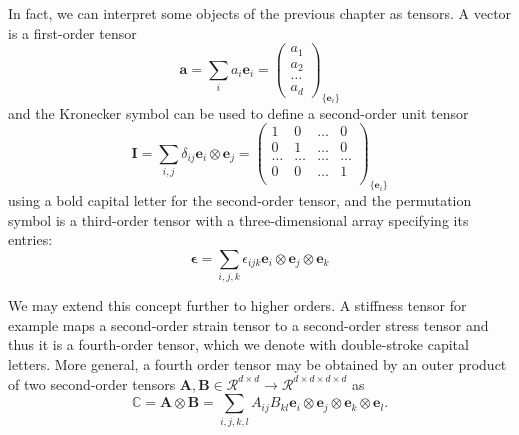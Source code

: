 In fact, we can interpret some objects of the previous chapter as tensors. A vector is a first-order tensor 
\begin{equation}
    \mathbf{a} = \sum_{i} a_i \mathbf{e}_i = 
    \begin{pmatrix}
         a_1 \\
         a_2 \\
         \dots \\
         a_d
    \end{pmatrix}_{\{\mathbf{e}_i\}}
\end{equation}
and the Kronecker symbol can be used to define a second-order unit tensor 
\begin{equation}
    \pmb{I} = \sum_{i,j} \delta_{ij} \mathbf{e}_i \otimes \mathbf{e}_j = 
    \begin{pmatrix}
         1      & 0     & \dots & 0 \\
         0      & 1     & \dots & 0 \\
         \dots  & \dots & \dots & \dots  \\
         0      & 0     & \dots & 1  \\
    \end{pmatrix}_{\{\mathbf{e}_i\}}
\end{equation}
using a bold capital letter for the second-order tensor, and the permutation symbol is a third-order tensor with a three-dimensional array specifying its entries: 
\begin{equation}
    \pmb{\epsilon} = \sum_{i,j,k} \epsilon_{ijk} \mathbf{e}_i \otimes \mathbf{e}_j \otimes \mathbf{e}_k
\end{equation}

We may extend this concept further to higher orders. A stiffness tensor for example maps a second-order strain tensor to a second-order stress tensor and thus it is a fourth-order tensor, which we denote with double-stroke capital letters. More general, a fourth order tensor may be obtained by an outer product of two second-order tensors $\mathbf{A},\mathbf{B}\in \mathcal{R}^{d \times d} \rightarrow \mathcal{R}^{d \times d \times d \times d}$ as 
\begin{equation}
    \mathbb{C} = \mathbf{A} \otimes \mathbf{B} = \sum_{i,j,k,l} A_{ij}B_{kl}  \mathbf{e}_i \otimes \mathbf{e}_j \otimes \mathbf{e}_k \otimes \mathbf{e}_l.
\end{equation}

